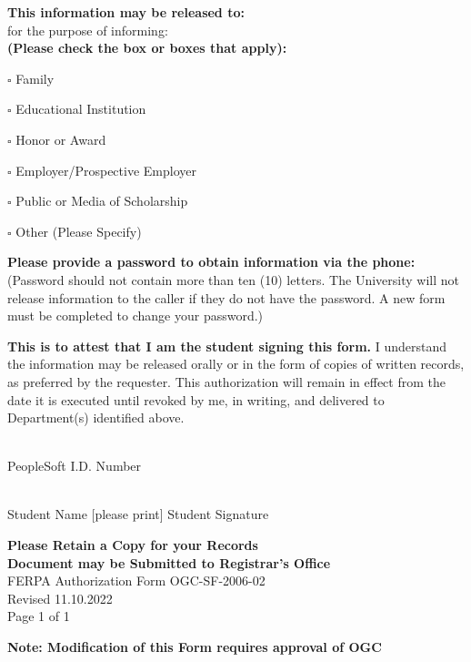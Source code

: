 \documentclass[12pt]{article}
\begin{document}
\textbf{This information may be released to:} \underline{\hspace{9cm}}\\
[Print Name(s) of Individual(s) To Whom University May Disclose Information]

\underline{\hspace{9cm}} for the purpose of informing:\\
[List Additional Individuals if Necessary]

\textbf{(Please check the box or boxes that apply):}
\begin{list}{}{\leftmargin=0pt \itemindent=0pt \setlength{\itemsep}{0pt}}
    \item $\square$ Family
    \item $\square$ Educational Institution
    \item $\square$ Honor or Award
    \item $\square$ Employer/Prospective Employer
    \item $\square$ Public or Media of Scholarship
    \item $\square$ Other (Please Specify) \underline{\hspace{5cm}}
\end{list}

\textbf{Please provide a password to obtain information via the phone:} \underline{\hspace{3.5cm}}\\
\footnotesize (Password should not contain more than ten (10) letters. The University will not release information to the caller if they do not have the password. A new form must be completed to change your password.)

\vspace{0.3cm}
\textbf{This is to attest that I am the student signing this form.} I understand the information may be released orally or in the form of copies of written records, as preferred by the requester. This authorization will remain in effect from the date it is executed until revoked by me, in writing, and delivered to Department(s) identified above.

\vspace{0.6cm}
\underline{\hspace{5.5cm}}\\
PeopleSoft I.D. Number

\vspace{0.3cm}
\underline{\hspace{5.5cm}} \hspace{0.5cm} \underline{\hspace{5.5cm}}\\
Student Name [please print] \hspace{2cm} Student Signature

\vspace{0.6cm}
\textbf{Please Retain a Copy for your Records}\\
\textbf{Document may be Submitted to Registrar’s Office}\\
FERPA Authorization Form OGC-SF-2006-02\\
Revised 11.10.2022\\
Page 1 of 1

\vfill
\hfill \textbf{Note: Modification of this Form requires approval of OGC}
\end{document}
